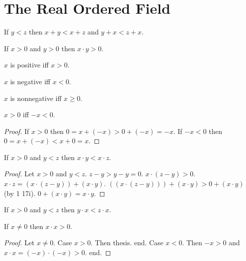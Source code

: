 \documentclass{article}
\begin{document}
\section{The Real Ordered Field}

\begin{forthel}

\begin{axiom}[1 17 i]
If $y < z$ then $x + y < x + z$ and $y + x < z + x$.
\end{axiom}

\begin{axiom}[1 17 ii]
If $x > 0$ and $y > 0$ then $x \cdot y > 0$.
\end{axiom}

\begin{definition}
$x$ is positive iff $x > 0$.
\end{definition}

\begin{definition}
$x$ is negative iff $x < 0$.
\end{definition}

\begin{definition}
$x$ is nonnegative iff $x \geq 0$.
\end{definition}


\begin{proposition}[1 18 a]
$x > 0$ iff $-x < 0$.
\end{proposition}
\begin{proof}
If $x > 0$ then $0 = x + (-x) > 0 + (-x) = -x$.
If $-x < 0$ then $0 = x + (-x) < x + 0 = x$.
\end{proof}

\begin{proposition}[1 18 b]
If $x > 0$ and $y < z$ then
$x \cdot y < x \cdot z$.
\end{proposition}
\begin{proof}
Let $x > 0$ and $y < z$.
$z - y > y - y = 0$.
$x \cdot (z - y) > 0$.
$x \cdot z = (x \cdot (z - y)) + (x \cdot y)$.
$((x \cdot (z - y))) + (x \cdot y)  > 0 + (x \cdot y)$ (by 1 17i).
$0 + (x \cdot y) = x \cdot y$.
\end{proof}

\begin{proposition}[1 18 bb]
If $x > 0$ and $y < z$ then
$y \cdot x < z \cdot x$.
\end{proposition}


\begin{proposition}[1 18 d]
If $x \neq 0$ then $x \cdot x > 0$.
\end{proposition}
\begin{proof}
Let $x \neq 0$.
Case $x > 0$. Then thesis. end.
Case $x < 0$. Then $ -x > 0$ and $x \cdot x = (-x) \cdot (-x) > 0$. end.
\end{proof}


\end{forthel}
\end{document}
